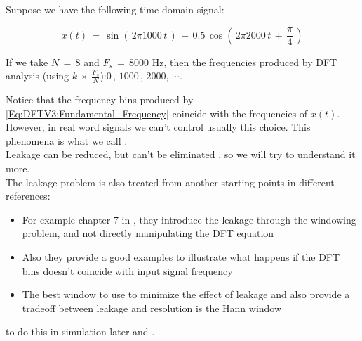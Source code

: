 \documentclass[12pt,a4paper]{book}
\begin{document}
\begin{itemize}
Suppose we have the following time domain signal:

\begin{equation}
x(t) \, = \, \sin{\left( \, 2 \pi 1000 \, t\,\right)} \, + \, 0.5 \, \cos{\left(\, 2 \pi 2000 \,t \, + \, \displaystyle\frac{\pi}{4}\,\right)}      
\end{equation}

If we take $N \, = \, 8$ and $F_s \, =\, 8000$ Hz, then the frequencies produced by DFT analysis (using $k \, \times \, \displaystyle\frac{F_s}{N}$):$0 \, , \, 1000\, ,\, 2000 , \, \cdots$.

Notice that the frequency bins produced by \autoref{Eq:DFTV3:Fundamental_Frequency} coincide with the  frequencies of $x(t)$. However, in real word signals we can't control usually this choice. This phenomena is what we call .\\

Leakage can be reduced, but can't be eliminated , so we will try to understand it more.\\

The leakage problem is also treated from another starting points in different references:

\begin{itemize}
    \item For example chapter 7 in \cite{DSP_DimitrisManolakis}, they introduce the leakage through the windowing problem, and not directly manipulating the DFT equation
    
    
    \item Also they provide a good examples to illustrate what happens if the DFT bins doesn't coincide with input signal frequency
    
    
    \item The best window to use to minimize the effect of leakage and also provide a tradeoff between leakage and resolution is the Hann window
    
    
\end{itemize}

 to do this in simulation later and .



    
\end{itemize}








\end{document}
